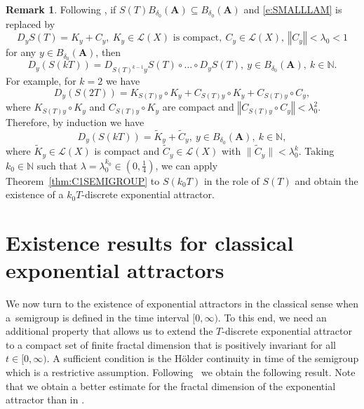 \documentclass[a4paper,12pt,reqno]{amsart}
\theoremstyle{plain}
\theoremstyle{definition}
\newtheorem{rem}[lem]{Remark}
\numberwithin{equation}{section}
\newcommand{\N}{\mathbb{N}}
\newcommand{\norm}[1]{\left\Vert#1\right\Vert}
\begin{document}
\begin{rem}
Following \cite[Section 3]{DN01}, if  $S(T)B_{\delta_0}(\mathbf{A})\subseteq B_{\delta_0}(\mathbf{A})$ and \eqref{e:SMALLLAM} is replaced by
\begin{equation*}
D_{y}S(T)=K_{y}+C_{y},\ K_{y}\in\mathcal{L}(X)\text{ is compact},\ C_{y}\in\mathcal{L}(X),\ \norm{C_y}<\lambda_0<1
\end{equation*}
for any $y\in B_{\delta_0}(\mathbf{A})$, then
$$D_y(S(kT))=D_{S(T)^{k-1}y}S(T)\circ\ldots\circ D_yS(T),\ y\in B_{\delta_0}(\mathbf{A}),\ k\in\N.$$
For example, for $k=2$ we have
$$D_y(S(2T))=K_{S(T)y}\circ K_y+C_{S(T)y}\circ K_y+C_{S(T)y}\circ C_y,$$
where $K_{S(T)y}\circ K_y$ and $C_{S(T)y}\circ K_y$ are compact and $\norm{C_{S(T)y}\circ C_y}<\lambda_0^2$. 
Therefore, by induction we have
$$D_y(S(kT))=\tilde{K}_y+\tilde{C}_y,\ y\in B_{\delta_0}(\mathbf{A}),\ k\in\N,$$
where $\tilde{K}_y\in\mathcal{L}(X)$ is compact and $\tilde{C}_y\in\mathcal{L}(X)$ with $\|\tilde{C}_y\|<\lambda_0^k$.
Taking $k_0\in\N$ such that $\lambda=\lambda_0^{k_0}\in(0,\frac{1}{4})$, we can apply Theorem~\ref{thm:C1SEMIGROUP} to $S(k_0T)$ in the role of $S(T)$ and obtain the existence of a $k_0T$-discrete exponential attractor.
\end{rem} 

\section{Existence results for classical exponential attractors}\label{sec:EA}

We now turn to the existence of exponential attractors in the classical sense when a~semigroup is defined in the time interval $[0,\infty)$. To this end, we need an additional property that allows us to extend the $T$-discrete exponential attractor to a compact set of finite fractal dimension that is positively invariant for all $t\in[0,\infty)$. A sufficient condition is the H\"older continuity in time of the semigroup which is a restrictive assumption. 
Following~\cite{sonner2012} we obtain the following result. Note that we obtain a better estimate for the fractal dimension of the exponential attractor than in \cite{chueshov, CzEf}.
\end{document}
